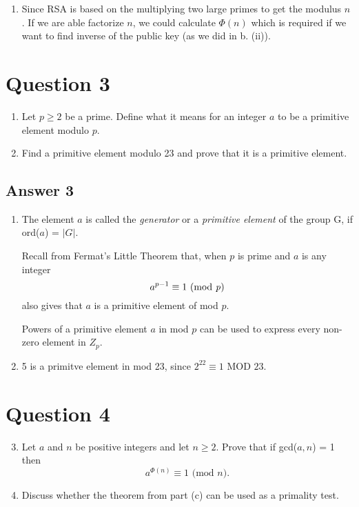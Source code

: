 \documentclass{article}
\begin{document}
\begin{enumerate}
\begin{enumerate}
		\end{enumerate}
		
		\item Since RSA is based on the multiplying two large primes to get the modulus $n$. If we are able factorize $n$, we could calculate $\Phi(n)$ which is required if we want to find inverse of the public key (as we did in b. (ii)). 
	\end{enumerate}	

	\medspace

	\section*{Question 3}
	\renewcommand{\theenumi}{\alph{enumi}}
	\begin{enumerate}
		\item Let $p \ge 2$ be a prime. Define what it means for an integer $a$ to be a primitive element modulo $p$.
		
		\item Find a primitive element modulo 23 and prove that it is a primitive element.
	\end{enumerate}	

	\subsection*{Answer 3}
	\renewcommand{\theenumi}{\alph{enumi}}
	\begin{enumerate}
		\item The element $a$ is called the \textit{generator} or a \textit{primitive element} of the group G, if ord($a$) = $|G|$.
		
		Recall from Fermat's Little Theorem that, when $p$ is prime and $a$ is any integer 
		$$a^{p-1} \equiv 1 \text{ (mod \textit{p})}$$
		also gives that $a$ is a primitive element of mod $p$. 
		
		Powers of a primitive element $a$ in mod $p$ can be used to express every non-zero element in $Z_p$.
		
		\item 5 is a primitve element in mod 23, since $2^{22} \equiv 1 \text{ MOD } 23$. 
	\end{enumerate}	
		
	\medspace
	
	\section*{Question 4}
	\renewcommand{\theenumi}{\alph{enumi}}
	\begin{enumerate}
		\setcounter{enumi}{2}
		\item Let $a$ and $n$ be positive integers and let $n  \ge 2$. Prove that if gcd($a, n$) = 1 then
		$$
		a^{\Phi(n)} \equiv 1 \text{ (mod $n$)}.
		$$
		
		\item Discuss whether the theorem from part (c) can be used as a primality test.
	\end{enumerate}	
\end{document}
